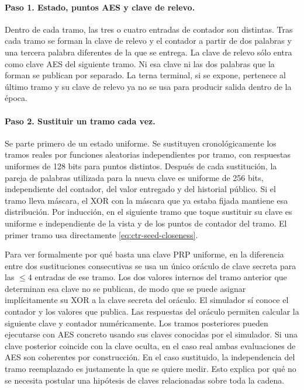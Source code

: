 \documentclass[11pt,a4paper]{article}
\begin{document}
\paragraph{Paso 1. Estado, puntos AES y clave de relevo.}
Dentro de cada tramo, las tres o cuatro
entradas de contador son distintas. Tras
cada tramo se forman la clave de relevo y
el contador a partir de dos palabras y una
tercera palabra diferentes de la que se
entrega. La clave de relevo sólo entra como
clave AES del siguiente tramo. Ni esa
clave ni las dos palabras que la forman
se publican por separado. La terna terminal,
si se expone, pertenece al último tramo y
su clave de relevo ya no se usa para
producir salida dentro de la época.

\paragraph{Paso 2. Sustituir un tramo cada vez.}
Se parte primero de un estado uniforme.
Se sustituyen cronológicamente los tramos
reales por funciones aleatorias independientes
por tramo, con respuestas uniformes de
128 bits para puntos distintos.
Después de cada sustitución, la pareja de
palabras utilizada para la nueva clave
es uniforme de 256 bits, independiente del
contador, del valor entregado y del
historial público. Si el tramo lleva máscara,
el XOR con la máscara que ya estaba fijada
mantiene esa distribución. Por inducción,
en el siguiente tramo que toque sustituir
su clave es uniforme e independiente de
la vista y de los puntos de contador del
tramo. El primer tramo usa directamente
\eqref{eq:ctr-seed-closeness}.

Para ver formalmente por qué basta una
clave PRP uniforme, en la diferencia
entre dos sustituciones consecutivas se
usa un único oráculo de clave secreta
para las \(\le4\) entradas de ese tramo.
Los dos valores internos del tramo
anterior que determinan esa clave no se
publican, de modo que se puede asignar
implícitamente su XOR a la clave
secreta del oráculo. El simulador sí
conoce el contador y los valores que
publica. Las respuestas del oráculo
permiten calcular la siguiente clave y
contador numéricamente. Los tramos
posteriores pueden ejecutarse con AES
concreto usando sus claves conocidas por
el simulador. Si una clave posterior
coincide con la clave oculta, en el caso
real ambas evaluaciones de AES son
coherentes por construcción. En el caso
sustituido, la independencia del tramo
reemplazado es justamente la que se
quiere medir. Esto explica por qué no
se necesita postular una hipótesis de
claves relacionadas sobre toda la cadena.
\end{document}
